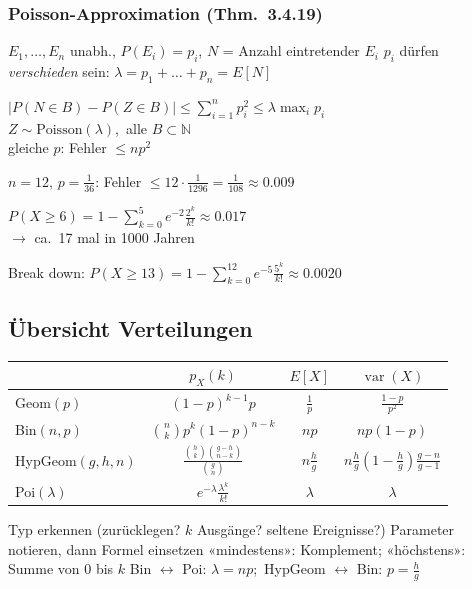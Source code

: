 \subsubsection*{Poisson-Approximation (Thm.\ 3.4.19)}
\begin{itemize}
\pfeil $E_1,\dots,E_n$ unabh., $P(E_i)=p_i$, $N$ = Anzahl eintretender $E_i$
\pfeil $p_i$ dürfen \emph{verschieden} sein: $\lambda=p_1+\dots+p_n=E[N]$
\end{itemize}
\begin{formel}
$\displaystyle |P(N\in B)-P(Z\in B)|\le\sum_{i=1}^np_i^2\le\lambda\max_ip_i$\\
$Z\sim\mathrm{Poisson}(\lambda)$,\ alle $B\subset\mathbb N$\\
gleiche $p$: Fehler $\le np^2$
\end{formel}
\begin{bsp}
$n=12$, $p=\frac1{36}$: Fehler $\le12\cdot\frac1{1296}=\frac1{108}\approx0.009$
\end{bsp}
\begin{bsp}[{{Haiangriffe Florida: im Mittel $\lambda=2$ pro Jahr}}]
$P(X\ge6)=1-\sum_{k=0}^5e^{-2}\frac{2^k}{k!}\approx0.017$\\
$\to$ ca.\ 17 mal in 1000 Jahren
\end{bsp}
\begin{bsp}[{{Aufg.\ 3.4.21: Server, $\lambda=5$/s, max.\ 12/s}}]
Break down: $P(X\ge13)=1-\sum_{k=0}^{12}e^{-5}\frac{5^k}{k!}\approx0.0020$
\end{bsp}

\subsection{Übersicht Verteilungen}
\begin{center}
\small
\begin{tabular}{@{}lccc@{}}
\toprule
& $p_X(k)$ & $E[X]$ & $\operatorname{var}(X)$\\\midrule
Geom$(p)$ & $(1-p)^{k-1}p$ & $\frac1p$ & $\frac{1-p}{p^2}$\\
Bin$(n,p)$ & $\binom nk p^k(1-p)^{n-k}$ & $np$ & $np(1-p)$\\
HypGeom$(g,h,n)$ & $\frac{\binom hk\binom{g-h}{n-k}}{\binom gn}$ & $n\frac hg$ & $n\frac hg(1-\frac hg)\frac{g-n}{g-1}$\\
Poi$(\lambda)$ & $e^{-\lambda}\frac{\lambda^k}{k!}$ & $\lambda$ & $\lambda$\\\bottomrule
\end{tabular}
\end{center}
\begin{merke}[{{Checkliste}}]
\begin{itemize}
\pfeil Typ erkennen (zurücklegen? $k$ Ausgänge? seltene Ereignisse?)
\pfeil Parameter notieren, dann Formel einsetzen
\pfeil «mindestens»: Komplement; «höchstens»: Summe von 0 bis $k$
\pfeil Bin $\leftrightarrow$ Poi: $\lambda=np$;\ HypGeom $\leftrightarrow$ Bin: $p=\frac hg$
\end{itemize}
\end{merke}

